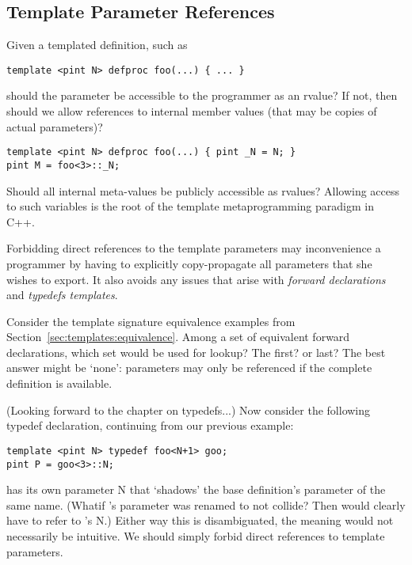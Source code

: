 \subsection{Template Parameter References}
\label{sec:templates:issues:param_ref}

Given a templated definition, such as

\begin{verbatim}
template <pint N> defproc foo(...) { ... }
\end{verbatim}

should the parameter  be accessible to the programmer
as an rvalue?
If not, then should we allow references to internal member values
(that may be copies of actual parameters)?

\begin{verbatim}
template <pint N> defproc foo(...) { pint _N = N; }
pint M = foo<3>::_N;
\end{verbatim}

Should all internal meta-values be publicly accessible as rvalues?
Allowing access to such variables is the root of the template
metaprogramming paradigm in C++.  

Forbidding direct references to the template parameters may 
inconvenience a programmer by having to explicitly copy-propagate
all parameters that she wishes to export.  
It also avoids any issues that arise with \emph{forward declarations}
and \emph{typedefs templates}.  

Consider the template signature equivalence examples from
Section~\ref{sec:templates:equivalence}.  
Among a set of equivalent forward declarations, which set
would be used for lookup?  The first? or last?  
The best answer might be `none': parameters may only be referenced
if the complete definition is available.  

(Looking forward to the chapter on typedefs...)
Now consider the following typedef declaration, continuing from
our previous example:

\begin{verbatim}
template <pint N> typedef foo<N+1> goo;
pint P = goo<3>::N;
\end{verbatim}

 has its own parameter N that `shadows' the base definition's
parameter of the same name.  
(Whatif 's parameter was renamed to not collide?
Then  would clearly have to refer to 's N.)  
Either way this is disambiguated, the meaning would not necessarily be 
intuitive.  
We should simply forbid direct references to template parameters.  

